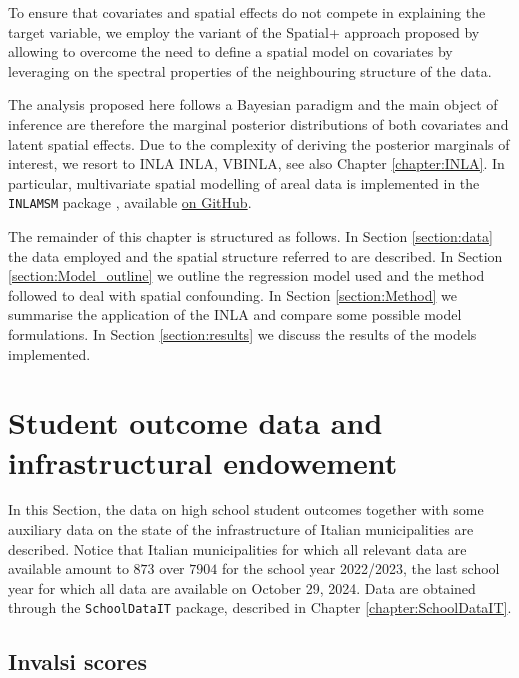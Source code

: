 \documentclass[openany]{book}
\begin{document}
To ensure that covariates and spatial effects do not compete in explaining the target variable, we employ the variant of the Spatial+ approach proposed by \citep{Urdangarin24} allowing to overcome the need to define a spatial model on covariates by leveraging on the spectral properties of the neighbouring structure of the data.

The analysis proposed here follows a Bayesian paradigm and the main object of inference are therefore the marginal posterior distributions of both covariates and latent spatial effects. Due to the complexity of deriving the posterior marginals of interest, we resort to INLA {INLA, VBINLA}, see also Chapter \ref{chapter:INLA}. In particular, multivariate spatial modelling of areal data is implemented in the \texttt{INLAMSM} package \citep{INLAMSM, INLAMSM2}, available \href{https://github.com/becarioprecario/INLAMSM}{on GitHub}.
 
The remainder of this chapter is structured as follows. In Section \ref{section:data} the data employed and the spatial structure referred to are described. In Section \ref{section:Model_outline} we outline the regression model used and the method followed to deal with spatial confounding. In Section \ref{section:Method} we summarise the application of the INLA and compare some possible model formulations. In Section \ref{section:results} we discuss the results of the models implemented.



\section{Student outcome data and infrastructural endowement} \label{section:Invalsi:data}
In this Section, the data on high school student outcomes together with some auxiliary data on the state of the infrastructure of Italian municipalities are described. 
Notice that Italian municipalities for which all relevant data are available amount to $873$ over $7904$ for the school year 2022/2023, the last school year for which all data are available on October 29, 2024. Data are obtained through the \texttt{SchoolDataIT} package, described in Chapter \ref{chapter:SchoolDataIT}. 
 
\subsection{Invalsi scores}\label{Par:Invalsi} 
\end{document}
